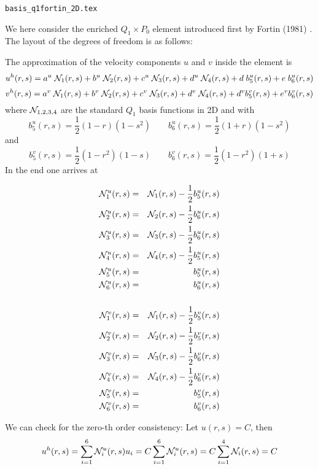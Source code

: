 \begin{flushright} {\tiny {\color{gray} \tt basis\_q1fortin\_2D.tex}} \end{flushright}

We here consider the enriched $Q_1\times P_0$ element introduced first by 
Fortin (1981) \cite{fort81}.
The layout of the degrees of freedom is as follows:



\noindent The approximation of the velocity components $u$ and $v$ inside the element is
\[
u^h(r,s) = a^u \; {\mathcal{N}}_1(r,s) + b^u \;  {\mathcal{N}}_2(r,s) + c^u \; {\mathcal{N}}_3(r,s) +d^u \; {\mathcal{N}}_4(r,s) 
+ d\; b_5^u(r,s) + e\; b_{6}^u(r,s)
\]
\[
v^h(r,s) = a^v \; {\mathcal{N}}_1(r,s) + b^v \;  {\mathcal{N}}_2(r,s) + c^v \; {\mathcal{N}}_3(r,s) +d^v \; {\mathcal{N}}_4(r,s) 
+ d^v b_5^v(r,s) + e^v b_{6}^v(r,s)
\]
where ${\mathcal{N}}_{1,2,3,4}$ are the standard $Q_1$ basis functions in 2D and with 
\[
b_5^u(r,s) = \frac{1}{2}(1-r)(1-s^2)
\qquad
b_6^u(r,s) = \frac{1}{2}(1+r)(1-s^2)
\]
and
\[
b_5^v(r,s) = \frac{1}{2}(1-r^2)(1-s)
\qquad
b_6^v(r,s) = \frac{1}{2}(1-r^2)(1+s)
\]
In the end one arrives at

\begin{mdframed}[backgroundcolor=blue!5]
\begin{eqnarray}
{{\mathcal{N}}}_1^u(r,s) &=&  {\mathcal{N}}_1(r,s) - \frac{1}{2} b_5^u(r,s)\nonumber\\
{{\mathcal{N}}}_2^u(r,s) &=&  {\mathcal{N}}_2(r,s) - \frac{1}{2} b_6^u(r,s)\nonumber\\
{{\mathcal{N}}}_3^u(r,s) &=&  {\mathcal{N}}_3(r,s) - \frac{1}{2} b_6^u(r,s)\nonumber\\
{{\mathcal{N}}}_4^u(r,s) &=&  {\mathcal{N}}_4(r,s) - \frac{1}{2} b_5^u(r,s)\nonumber\\
{{\mathcal{N}}}_5^u(r,s) &=&  b_5^u(r,s) \nonumber\\
{{\mathcal{N}}}_6^u(r,s) &=&  b_6^u(r,s) \nonumber\\
\nonumber\\
{{\mathcal{N}}}_1^v(r,s) &=&  {\mathcal{N}}_1(r,s) - \frac{1}{2} b_5^v(r,s)\nonumber\\
{{\mathcal{N}}}_2^v(r,s) &=&  {\mathcal{N}}_2(r,s) - \frac{1}{2} b_5^v(r,s)\nonumber\\
{{\mathcal{N}}}_3^v(r,s) &=&  {\mathcal{N}}_3(r,s) - \frac{1}{2} b_6^v(r,s)\nonumber\\
{{\mathcal{N}}}_4^v(r,s) &=&  {\mathcal{N}}_4(r,s) - \frac{1}{2} b_6^v(r,s)\nonumber\\
{{\mathcal{N}}}_5^v(r,s) &=&  b_5^v(r,s) \nonumber\\
{{\mathcal{N}}}_6^v(r,s) &=&  b_6^v(r,s) 
\end{eqnarray}
\end{mdframed}

We can check for the zero-th order consistency: Let $u(r,s)=C$, then 
\begin{eqnarray}
u^h(r,s) 
= \sum_{i=1}^6 {\mathcal{N}}_i^u(r,s) u_i 
= C \sum_{i=1}^6 {\mathcal{N}}_i^u(r,s) 
= C \sum_{i=1}^4 {\mathcal{N}}_i(r,s)  
= C
\end{eqnarray}





